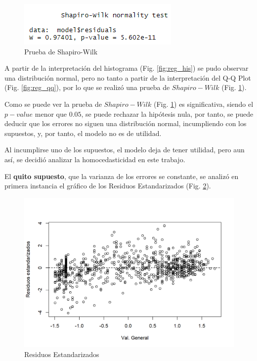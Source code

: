\documentclass[a4paper,10pt,twocolumn]{article}
\begin{document}
\begin{figure}[htb]%
	\begin{center}
		\includegraphics[width=\linewidth]{reg_shapiro}
	\end{center}
	\caption{Prueba de Shapiro-Wilk \label{fig:reg_shapiro}}%
\end{figure}

A partir de la interpretación del histograma (Fig. \ref{fig:reg_his}) se pudo observar una distribución normal, pero no tanto a partir de la interpretación del Q-Q Plot (Fig. \ref{fig:reg_qq}), por lo que se realizó una prueba de $Shapiro-Wilk$ (Fig. \ref{fig:reg_shapiro}).

Como se puede ver la prueba de $Shapiro-Wilk$ (Fig. \ref{fig:reg_shapiro}) es significativa, siendo el $p-value$ menor que $0.05$, se puede rechazar la hipótesis nula, por tanto, se puede deducir que los errores no siguen una distribución normal, incumpliendo con los supuestos, y, por tanto, el modelo no es de utilidad.

Al incumplirse uno de los supuestos, el modelo deja de tener utilidad, pero aun así, se decidió analizar la homocedasticidad en este trabajo.

El \textbf{quito supuesto}, que la varianza de los errores se constante, se analizó en primera instancia el gráfico de los Residuos Estandarizados (Fig. \ref{fig:reg_res}).

\begin{figure}[htb]%
	\begin{center}
		\includegraphics[width=\linewidth]{reg_res}
	\end{center}
	\caption{Residuos Estandarizados \label{fig:reg_res}}%
\end{figure}
\end{document}
